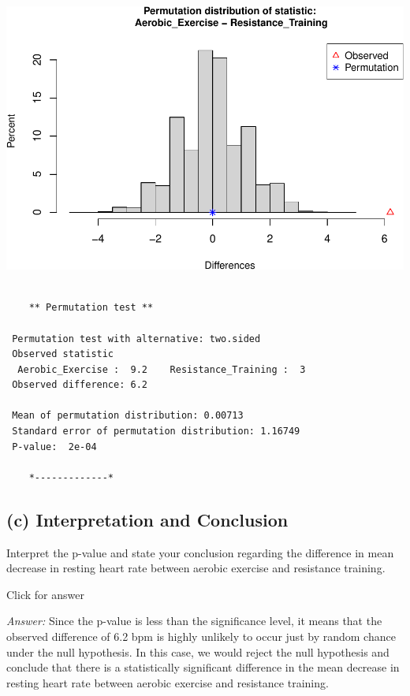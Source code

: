 \documentclass[
]{book}
\begin{document}
\includegraphics[width=1\linewidth]{Class_Activity_13_files/figure-latex/unnamed-chunk-1-1}

\begin{verbatim}

    ** Permutation test **

 Permutation test with alternative: two.sided 
 Observed statistic
  Aerobic_Exercise :  9.2    Resistance_Training :  3 
 Observed difference: 6.2 

 Mean of permutation distribution: 0.00713 
 Standard error of permutation distribution: 1.16749 
 P-value:  2e-04 

    *-------------*
\end{verbatim}

\hypertarget{c-interpretation-and-conclusion}{%
\subsection{(c) Interpretation and Conclusion}\label{c-interpretation-and-conclusion}}

Interpret the p-value and state your conclusion regarding the difference in mean decrease in resting heart rate between aerobic exercise and resistance training.

Click for answer

\emph{Answer:} Since the p-value is less than the significance level, it means that the observed difference of 6.2 bpm is highly unlikely to occur just by random chance under the null hypothesis. In this case, we would reject the null hypothesis and conclude that there is a statistically significant difference in the mean decrease in resting heart rate between aerobic exercise and resistance training.
\end{document}
